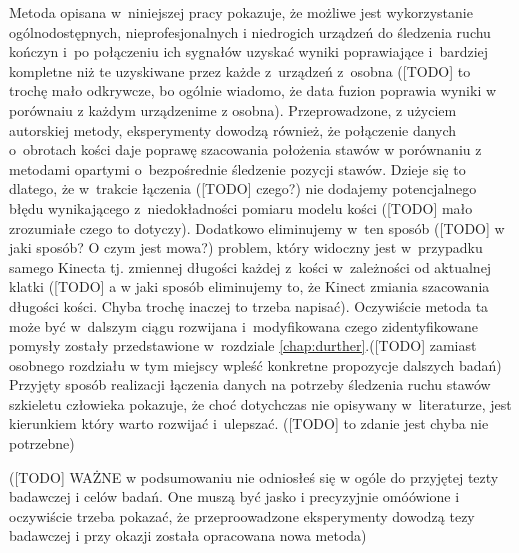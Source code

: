 Metoda opisana w~niniejszej pracy pokazuje, że możliwe jest wykorzystanie ogólnodostępnych, nieprofesjonalnych i niedrogich urządzeń do śledzenia ruchu kończyn i~po połączeniu ich sygnałów uzyskać wyniki poprawiające i~bardziej kompletne niż te uzyskiwane przez każde z~urządzeń z~osobna ([TODO] to trochę mało odkrywcze, bo ogólnie wiadomo, że data fuzion poprawia wyniki w porównaiu z każdym urządzenime z osobna). Przeprowadzone, z użyciem autorskiej metody, eksperymenty dowodzą również, że połączenie danych o~obrotach kości daje poprawę szacowania położenia stawów w porównaniu z metodami opartymi o~bezpośrednie śledzenie pozycji stawów. Dzieje się to dlatego, że w~trakcie łączenia ([TODO] czego?) nie dodajemy potencjalnego błędu wynikającego z~niedokładności pomiaru modelu kości ([TODO] mało zrozumiałe czego to dotyczy). Dodatkowo eliminujemy w~ten sposób ([TODO] w jaki sposób? O czym jest mowa?) problem, który widoczny jest w~przypadku samego Kinecta tj. zmiennej długości każdej z~kości w~zależności od aktualnej klatki ([TODO] a w jaki sposób eliminujemy to, że Kinect zmiania szacowania długości kości. Chyba trochę inaczej to trzeba napisać). Oczywiście metoda ta może być w~dalszym ciągu rozwijana i~modyfikowana czego zidentyfikowane pomysły zostały przedstawione w~rozdziale \ref{chap:durther}.([TODO] zamiast osobnego rozdziału w tym miejscy wpleść konkretne propozycje dalszych badań)\\

Przyjęty sposób realizacji łączenia danych na potrzeby śledzenia ruchu stawów szkieletu człowieka pokazuje, że choć dotychczas nie opisywany w~literaturze, jest kierunkiem który warto rozwijać i~ulepszać. ([TODO] to zdanie jest chyba nie potrzebne)

([TODO] WAŻNE w podsumowaniu nie odniosłeś się w ogóle do przyjętej tezty badawczej i celów badań. One muszą być jasko i precyzyjnie omóówione i oczywiście trzeba pokazać, że przeproowadzone eksperymenty dowodzą tezy badawczej i przy okazji została opracowana nowa metoda)